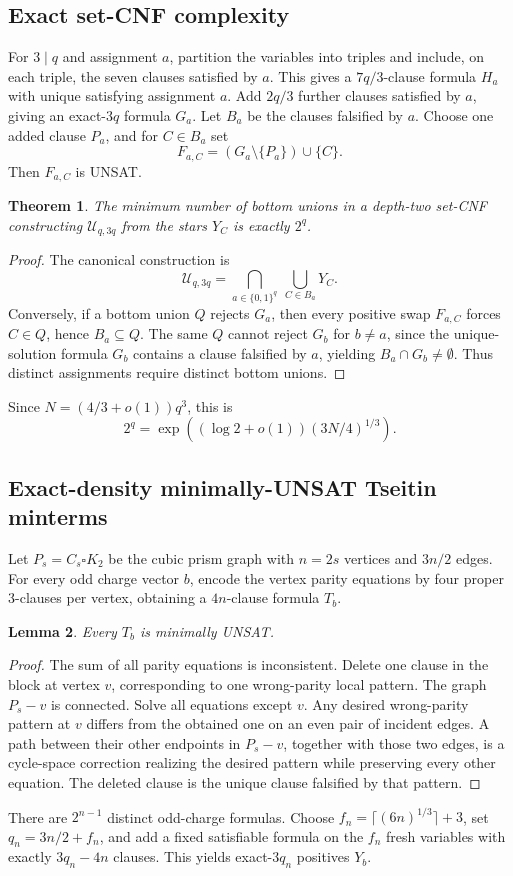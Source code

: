 \documentclass[11pt]{article}
\newtheorem{theorem}{Theorem}
\newtheorem{lemma}[theorem]{Lemma}
\begin{document}
\subsection{Exact set-CNF complexity}
For $3\mid q$ and assignment $a$, partition the variables into triples and include, on each triple, the seven clauses satisfied by $a$. This gives a $7q/3$-clause formula $H_a$ with unique satisfying assignment $a$. Add $2q/3$ further clauses satisfied by $a$, giving an exact-$3q$ formula $G_a$. Let $B_a$ be the clauses falsified by $a$. Choose one added clause $P_a$, and for $C\in B_a$ set
\[
F_{a,C}=(G_a\setminus\{P_a\})\cup\{C\}.
\]
Then $F_{a,C}$ is UNSAT.

\begin{theorem}
The minimum number of bottom unions in a depth-two set-CNF constructing $\mathcal U_{q,3q}$ from the stars $Y_C$ is exactly $2^q$.
\end{theorem}
\begin{proof}
The canonical construction is
\[
\mathcal U_{q,3q}=\bigcap_{a\in\{0,1\}^q}\ \bigcup_{C\in B_a}Y_C.
\]
Conversely, if a bottom union $Q$ rejects $G_a$, then every positive swap $F_{a,C}$ forces $C\in Q$, hence $B_a\subseteq Q$. The same $Q$ cannot reject $G_b$ for $b\ne a$, since the unique-solution formula $G_b$ contains a clause falsified by $a$, yielding $B_a\cap G_b\ne\emptyset$. Thus distinct assignments require distinct bottom unions.
\end{proof}
Since $N=(4/3+o(1))q^3$, this is
\[
2^q=\exp\left((\log2+o(1))(3N/4)^{1/3}\right).
\]

\subsection{Exact-density minimally-UNSAT Tseitin minterms}
Let $P_s=C_s\square K_2$ be the cubic prism graph with $n=2s$ vertices and $3n/2$ edges. For every odd charge vector $b$, encode the vertex parity equations by four proper 3-clauses per vertex, obtaining a $4n$-clause formula $T_b$.

\begin{lemma}
Every $T_b$ is minimally UNSAT.
\end{lemma}
\begin{proof}
The sum of all parity equations is inconsistent. Delete one clause in the block at vertex $v$, corresponding to one wrong-parity local pattern. The graph $P_s-v$ is connected. Solve all equations except $v$. Any desired wrong-parity pattern at $v$ differs from the obtained one on an even pair of incident edges. A path between their other endpoints in $P_s-v$, together with those two edges, is a cycle-space correction realizing the desired pattern while preserving every other equation. The deleted clause is the unique clause falsified by that pattern.
\end{proof}
There are $2^{n-1}$ distinct odd-charge formulas. Choose $f_n=\lceil(6n)^{1/3}\rceil+3$, set $q_n=3n/2+f_n$, and add a fixed satisfiable formula on the $f_n$ fresh variables with exactly $3q_n-4n$ clauses. This yields exact-$3q_n$ positives $Y_b$.
\end{document}
